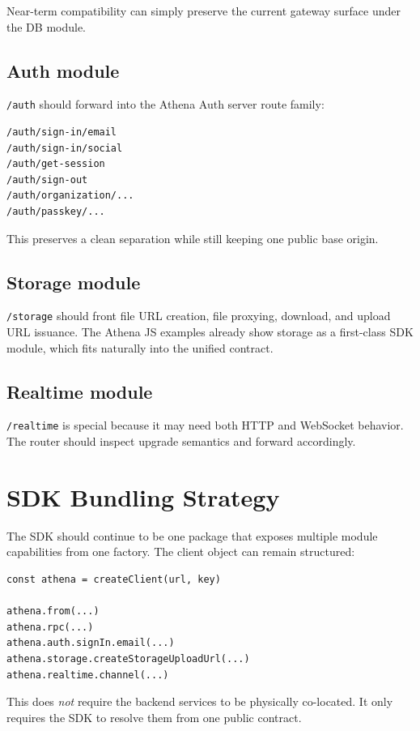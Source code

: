 \documentclass[11pt]{article}
\begin{document}
Near-term compatibility can simply preserve the current gateway surface under the DB module.

\subsection{Auth module}

\texttt{/auth} should forward into the Athena Auth server route family:

\begin{lstlisting}
/auth/sign-in/email
/auth/sign-in/social
/auth/get-session
/auth/sign-out
/auth/organization/...
/auth/passkey/...
\end{lstlisting}

This preserves a clean separation while still keeping one public base origin.

\subsection{Storage module}

\texttt{/storage} should front file URL creation, file proxying, download, and upload URL issuance. The Athena JS examples already show storage as a first-class SDK module, which fits naturally into the unified contract.

\subsection{Realtime module}

\texttt{/realtime} is special because it may need both HTTP and WebSocket behavior. The router should inspect upgrade semantics and forward accordingly.

\section{SDK Bundling Strategy}

The SDK should continue to be one package that exposes multiple module capabilities from one factory. The client object can remain structured:

\begin{lstlisting}[language=TypeScriptAthena]
const athena = createClient(url, key)

athena.from(...)
athena.rpc(...)
athena.auth.signIn.email(...)
athena.storage.createStorageUploadUrl(...)
athena.realtime.channel(...)
\end{lstlisting}

This does \emph{not} require the backend services to be physically co-located. It only requires the SDK to resolve them from one public contract.
\end{document}
